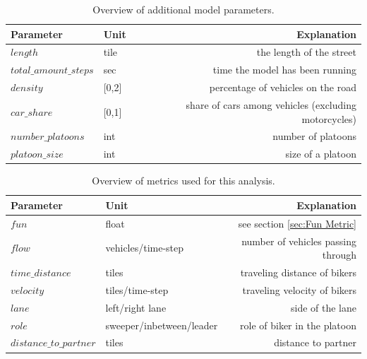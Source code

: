     \begin{table}[htb]
    \centering
    \begin{tabular}{@{}llr@{}} \toprule
        Parameter                   & Unit          & Explanation        \\ \midrule
        $length$                    & tile          & the length of the street \\
        $total\_amount\_steps$        & sec           & time the model has been running \\
        $density$                   & [0,2]         & percentage of vehicles on the road \\
        $car\_share$                 & [0,1]         & share of cars among vehicles (excluding motorcycles) \\
        $number\_platoons$           & int           & number of platoons \\
        $platoon\_size$              & int           & size of a platoon \\ \bottomrule
    \end{tabular}
    \caption{Overview of additional model parameters.} 
    \label{tab:moreparameters}
    \end{table}


    \begin{table}[htb]
    \centering
    \begin{tabular}{@{}llr@{}} \toprule
        Parameter                   & Unit                      & Explanation        \\ \midrule
        $fun$                       & float                     & see section \ref{sec:Fun Metric} \\
        $flow$                      & vehicles/time-step        & number of vehicles passing through \\
        $time\_distance$             & tiles                     & traveling distance of bikers\\
        $velocity$                  & tiles/time-step           & traveling velocity of bikers\\
        $lane$                      & left/right lane           & side of the lane \\
        $role$                      & sweeper/inbetween/leader  & role of biker in the platoon\\
        $distance\_to\_partner$       & tiles                     & distance to partner \\ \bottomrule
    \end{tabular}
    \caption{Overview of metrics used for this analysis.} 
    \label{tab:moremetrics}
    \end{table}


